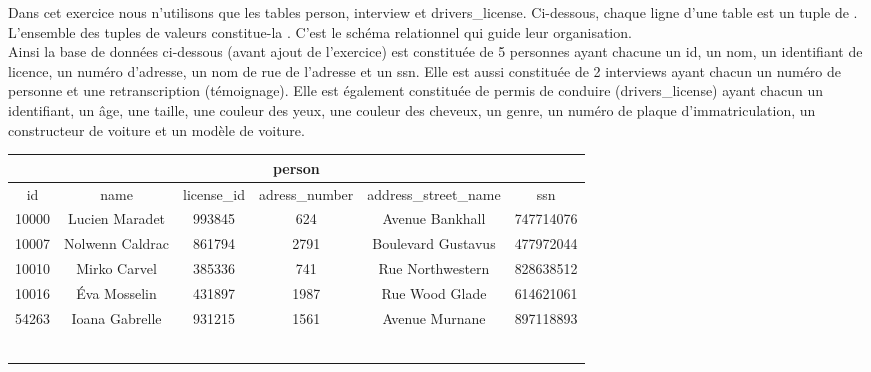 \begin{Exercise}
 Dans cet exercice  nous n'utilisons que les tables person, interview et drivers\_license. Ci-dessous, chaque ligne d'une table est un tuple de . L'ensemble des tuples de valeurs constitue-la . C'est le schéma relationnel qui guide leur organisation. \\
 Ainsi la base de données ci-dessous (avant ajout de l'exercice) est constituée de 5 personnes ayant chacune un id, un nom, un identifiant de licence, un numéro d'adresse, un nom de rue de l'adresse et un ssn. Elle est aussi constituée de 2 interviews ayant chacun un numéro de personne et une retranscription (témoignage). Elle est également constituée de permis de conduire (drivers\_license) ayant chacun un identifiant, un âge, une taille, une couleur des yeux, une couleur des cheveux, un genre, un numéro de plaque d'immatriculation, un constructeur de voiture et un modèle de voiture.

\begin{center}

\begin{tabular}{|c c c c c c|}
\hline
\multicolumn{6}{|c|}{\textbf{person}} \\
\hline
    id & name & license\_id & adress\_number & address\_street\_name & ssn \\
    \hline
    \hline
    10000	& Lucien Maradet	& 993845	& 624	& Avenue Bankhall & 747714076\\
10007	& Nolwenn Caldrac	& 861794	& 2791	& Boulevard Gustavus 	& 477972044\\
10010	& Mirko Carvel	& 385336	& 741	& Rue Northwestern	& 828638512\\
10016	& Éva Mosselin	& 431897	& 1987	& Rue Wood Glade	& 614621061\\
54263	& Ioana Gabrelle & 931215	& 1561	& Avenue Murnane & 897118893\\
& & & & &  \\
& & & & &  \\
& & & & &  \\
& & & & &  \\
& & & & &  \\
& & & & &  \\
\hline
\end{tabular}\\
\vspace{25pt}


\end{center}
\end{Exercise}
